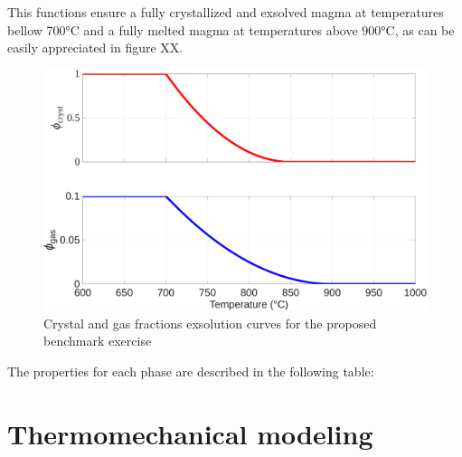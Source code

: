 This functions ensure a fully crystallized and exsolved magma at temperatures bellow 700°C and a fully melted magma at temperatures above 900°C, as can be easily appreciated in figure XX.

\begin{figure}
    \centering
    \includegraphics[width=1\linewidth]{img/chapter2/benchmarks/phis.png}
    \caption{Crystal and gas fractions exsolution curves for the proposed benchmark exercise}
    \label{fig:enter-label}
\end{figure}

The properties for each phase are described in the following table:

\begin{table}[H]
     \caption{Material properties for the different phases present in the magma, for the proposed benchamr simulation}
     \label{tab:enter_label}
 \end{table}


\section{Thermomechanical modeling}
